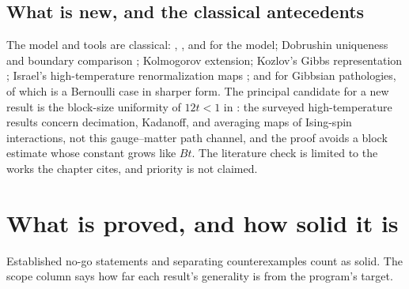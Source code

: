 \subsection{What is new, and the classical antecedents}
\label{comp:sb-antecedents}

The model and tools are classical: \citet{Wegner1971}, \citet{FradkinShenker1979}, and
\citet{OsterwalderSeiler1978} for the model; Dobrushin uniqueness \citep{Dobrushin1968} and boundary
comparison \citep{Georgii1988}; Kolmogorov extension; Kozlov's Gibbs representation \citep{Kozlov1974};
Israel's high-temperature renormalization maps \citep{Israel1981}; and \citet{VanEnterFernandezSokal1993}
for Gibbsian pathologies, of which  is a Bernoulli case in sharper form. The
principal candidate for a new result is the block-size uniformity of \(12t<1\) in
: the surveyed high-temperature results concern decimation,
Kadanoff, and averaging maps of Ising-spin interactions, not this gauge--matter path channel, and the proof
avoids a block estimate whose constant grows like \(Bt\). The literature check is limited to the works the
chapter cites, and priority is not claimed.

\section{What is proved, and how solid it is}
\label{comp:sb-scorecard}

Established no-go statements and separating counterexamples count as solid. The scope column says how far
each result's generality is from the program's target.


